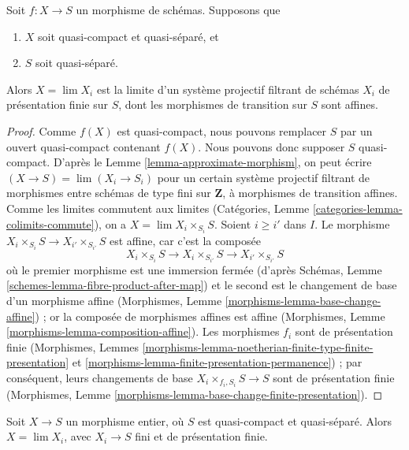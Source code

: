 \begin{lemma}
\label{lemma-relative-approximation}
Soit $f : X \to S$ un morphisme de schémas. Supposons que
\begin{enumerate}
\item $X$ soit quasi-compact et quasi-séparé, et
\item $S$ soit quasi-séparé.
\end{enumerate}
Alors $X = \lim X_i$ est la limite d'un système projectif filtrant de schémas $X_i$
de présentation finie sur $S$, dont les morphismes de transition sur $S$
sont affines.
\end{lemma}

\begin{proof}
Comme $f(X)$ est quasi-compact, nous pouvons remplacer $S$ par un ouvert
quasi-compact contenant $f(X)$. Nous pouvons donc supposer $S$
quasi-compact. D'après le Lemme \ref{lemma-approximate-morphism}, on peut
écrire $(X \to S) = \lim (X_i \to S_i)$ pour un certain système projectif
filtrant de morphismes entre schémas de type fini sur $\mathbf{Z}$, à
morphismes de transition affines. Comme les limites commutent aux limites
(Catégories, Lemme \ref{categories-lemma-colimits-commute}), on a
$X = \lim X_i \times_{S_i} S$. Soient $i \geq i'$ dans $I$. Le morphisme
$X_i \times_{S_i} S \to X_{i'} \times_{S_{i'}} S$ est affine, car c'est la
composée
$$
X_i \times_{S_i} S \to X_i \times_{S_{i'}} S \to X_{i'} \times_{S_{i'}} S
$$
où le premier morphisme est une immersion fermée (d'après Schémas,
Lemme \ref{schemes-lemma-fibre-product-after-map}) et le second est le
changement de base d'un morphisme affine (Morphismes,
Lemme \ref{morphisms-lemma-base-change-affine}) ; or la composée de morphismes
affines est affine (Morphismes,
Lemme \ref{morphisms-lemma-composition-affine}). Les morphismes $f_i$ sont de
présentation finie (Morphismes, Lemmes
\ref{morphisms-lemma-noetherian-finite-type-finite-presentation} et
\ref{morphisms-lemma-finite-presentation-permanence}) ; par conséquent,
leurs changements de base $X_i \times_{f_i, S_i} S \to S$ sont de
présentation finie (Morphismes,
Lemme \ref{morphisms-lemma-base-change-finite-presentation}).
\end{proof}

\begin{lemma}
\label{lemma-integral-limit-finite-and-finite-presentation}
Soit $X \to S$ un morphisme entier, où $S$ est quasi-compact et
quasi-séparé. Alors $X = \lim X_i$, avec $X_i \to S$ fini et de présentation
finie.
\end{lemma}

